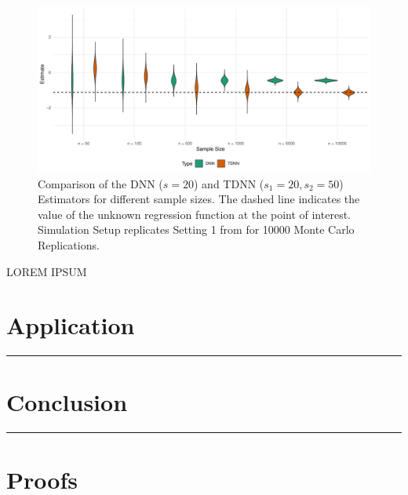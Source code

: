 \documentclass[letterpaper,10pt]{article}
\numberwithin{equation}{section}
\numberwithin{theorem}{section}
\numberwithin{remark}{section}
\numberwithin{example}{section}
\theoremstyle{definition}
\newcommand{\1}{\mathbb{1}}
\begin{document}
\begin{figure}[H]
	\includegraphics[width = \textwidth]{../Code/Simulations/Graphics/TDNN_DNN.pdf}
	\caption{Comparison of the DNN ($s = 20$) and TDNN ($s_1 = 20, s_2 = 50$) Estimators for different sample sizes.
		The dashed line indicates the value of the unknown regression function at the point of interest.
		Simulation Setup replicates Setting 1 from \citet{demirkaya_optimal_2024} for 10000 Monte Carlo Replications.}
\end{figure}

{\color{red} LOREM IPSUM}


\section{Application}\label{Application}
\hrule

\section{Conclusion}\label{Conclusion}
\hrule

\newpage
\printbibliography

\appendix
\section{Proofs}


\end{document}
